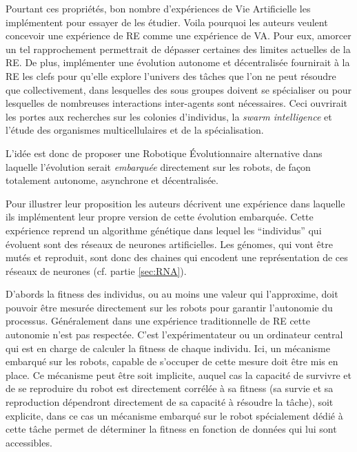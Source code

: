 Pourtant ces propriétés, bon nombre d'expériences de Vie Artificielle les implémentent pour essayer de les étudier. Voila pourquoi les auteurs veulent concevoir une expérience de RE comme une expérience de VA. Pour eux, amorcer un tel rapprochement permettrait de dépasser certaines des limites actuelles de la RE. De plus, implémenter une évolution autonome et décentralisée fournirait à la RE les clefs pour qu'elle explore l'univers des tâches que l'on ne peut résoudre que collectivement, dans lesquelles des sous groupes doivent se spécialiser ou pour lesquelles de nombreuses interactions inter-agents sont nécessaires. Ceci ouvrirait les portes aux recherches sur les colonies d'individus, la \emph{swarm intelligence} \citep{garnier2007biologicalprincipeswarmintelligence} et l'étude des organismes multicellulaires et de la spécialisation.

L'idée est donc de proposer une Robotique \'Evolutionnaire alternative dans laquelle l'évolution serait \emph{embarquée} directement sur les robots, de façon totalement autonome, asynchrone et décentralisée.

Pour illustrer leur proposition les auteurs décrivent une expérience dans laquelle ils implémentent leur propre version de cette évolution embarquée. Cette expérience reprend un algorithme génétique dans lequel les ``individus'' qui évoluent sont des réseaux de neurones artificielles. Les génomes, qui vont être mutés et reproduit, sont donc des chaines qui encodent une représentation de ces réseaux de neurones (cf. partie \ref{sec:RNA}).

D'abords la fitness des individus, ou au moins une valeur qui l'approxime, doit pouvoir être mesurée directement sur les robots pour garantir l'autonomie du processus. Généralement dans une expérience traditionnelle de RE cette autonomie n'est pas respectée. C'est l'expérimentateur ou un ordinateur central qui est en charge de calculer la fitness de chaque individu. Ici, un mécanisme embarqué sur les robots, capable de s'occuper de cette mesure doit être mis en place. Ce mécanisme peut être soit implicite, auquel cas la capacité de survivre et de se reproduire du robot est directement corrélée à sa fitness (sa survie et sa reproduction dépendront directement de sa capacité à résoudre la tâche), soit explicite, dans ce cas un mécanisme embarqué sur le robot spécialement dédié à cette tâche permet de déterminer la fitness en fonction de données qui lui sont accessibles. 

